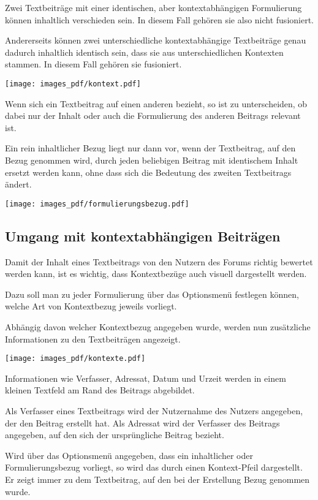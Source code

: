 \documentclass{article}
\begin{document}
	\bigskip
	Zwei Textbeiträge mit einer identischen, aber kontextabhängigen Formulierung können inhaltlich verschieden sein. In diesem Fall gehören sie also nicht fusioniert.
	
	\bigskip
	Andererseits können zwei unterschiedliche kontextabhängige Textbeiträge genau dadurch inhaltlich identisch sein, dass sie aus unterschiedlichen Kontexten stammen. In diesem Fall gehören sie fusioniert.
	
	\bigskip
	\texttt{[image: images\_pdf/kontext.pdf]}
	
	\bigskip
	Wenn sich ein Textbeitrag auf einen anderen bezieht, so ist zu unterscheiden, ob dabei nur der Inhalt oder auch die Formulierung des anderen Beitrags relevant ist. 
	
	\bigskip
	Ein rein inhaltlicher Bezug liegt nur dann vor, wenn der Textbeitrag, auf den Bezug genommen wird, durch jeden beliebigen Beitrag mit identischem Inhalt ersetzt werden kann, ohne dass sich die Bedeutung des zweiten Textbeitrags ändert.
	
	\bigskip
	\texttt{[image: images\_pdf/formulierungsbezug.pdf]}
	
	\subsection{Umgang mit kontextabhängigen Beiträgen}
	
	Damit der Inhalt eines Textbeitrags von den Nutzern des Forums richtig bewertet werden kann, ist es wichtig, dass Kontextbezüge auch visuell dargestellt werden.
	
	\bigskip
	Dazu soll man zu jeder Formulierung über das Optionsmenü festlegen können, welche Art von Kontextbezug jeweils vorliegt.
	
	\bigskip
	Abhängig davon welcher Kontextbezug angegeben wurde, werden nun zusätzliche Informationen zu den Textbeiträgen angezeigt.
	
	\bigskip
	\texttt{[image: images\_pdf/kontexte.pdf]}
	
	\bigskip
	Informationen wie Verfasser, Adressat, Datum und Urzeit werden in einem kleinen Textfeld am Rand des Beitrags abgebildet.
	
	\bigskip
	Als Verfasser eines Textbeitrags wird der Nutzernahme des Nutzers angegeben, der den Beitrag erstellt hat. Als Adressat wird der Verfasser des Beitrags angegeben, auf den sich der ursprüngliche Beitrag bezieht.
	
	\bigskip
	Wird über das Optionsmenü angegeben, dass ein inhaltlicher oder Formulierungsbezug vorliegt, so wird das durch einen Kontext-Pfeil dargestellt. Er zeigt immer zu dem Textbeitrag, auf den bei der Erstellung Bezug genommen wurde.
	
\end{document}
